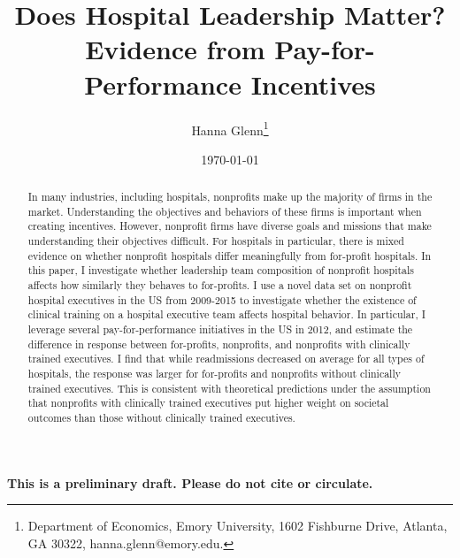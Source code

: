\documentclass[12pt]{article}
\begin{document}
	
	
	
	
	\linespread{1.2}\title{\vspace{-0.5in} Does Hospital Leadership Matter?\\ \large Evidence from Pay-for-Performance Incentives} 
	
	\date{\today}
	
	\author{\vspace{10mm}Hanna Glenn\footnote{Department of Economics, Emory University, 1602 Fishburne Drive, Atlanta, GA 30322, hanna.glenn@emory.edu.} }
	
	\maketitle
	
	\vspace{-0.2in}
	
	\singlespacing\maketitle

    \begin{center}
    \large
    \textbf{This is a preliminary draft. Please do not cite or circulate.}
	\end{center}

 \vspace{3mm}
	
    \begin{abstract}
		{\small
        In many industries, including hospitals, nonprofits make up the majority of firms in the market. Understanding the objectives and behaviors of these firms is important when creating incentives. However, nonprofit firms have diverse goals and missions that make understanding their objectives difficult. For hospitals in particular, there is mixed evidence on whether nonprofit hospitals differ meaningfully from for-profit hospitals. In this paper, I investigate whether leadership team composition of nonprofit hospitals affects how similarly they behaves to for-profits. I use a novel data set on nonprofit hospital executives in the US from 2009-2015 to investigate whether the existence of clinical training on a hospital executive team affects hospital behavior. In particular, I leverage several pay-for-performance initiatives in the US in 2012, and estimate the difference in response between for-profits, nonprofits, and nonprofits with clinically trained executives. I find that while readmissions decreased on average for all types of hospitals, the response was larger for for-profits and nonprofits without clinically trained executives. This is consistent with theoretical predictions under the assumption that nonprofits with clinically trained executives put higher weight on societal outcomes than those without clinically trained executives.
		} 
	\end{abstract}
	
\end{document}
